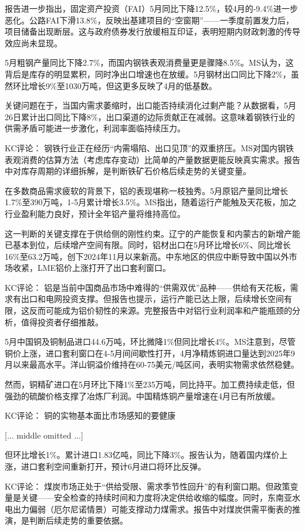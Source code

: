 \documentclass[11pt]{ctexart}
\begin{document}
报告进一步指出，固定资产投资（FAI）5月同比下降12.5\%，较4月的-9.4\%进一步恶化。公路FAI下滑13.8\%，反映出基建项目的“空窗期”——一季度前置发力后，项目储备出现断层。这与政府债券发行放缓相互印证，表明短期内财政刺激的传导效应尚未显现。

5月粗钢产量同比下降2.7\%，而国内钢铁表观消费量更是骤降8.5\%。MS认为，这背后是库存的明显累积，同时净出口增速也在放缓。5月钢材出口同比下降2\%，虽然环比增长9\%至1030万吨，但这更多反映了4月的低基数。

关键问题在于，当国内需求萎缩时，出口能否持续消化过剩产能？从数据看，5月26日累计出口同比下降8\%，出口渠道的边际贡献正在减弱。这意味着钢铁行业的供需矛盾可能进一步激化，利润率面临持续压力。

KC评论： 钢铁行业正在经历“内需塌陷、出口见顶”的双重挤压。MS对国内钢铁表观消费的估算方法（考虑库存变动）比简单的产量数据更能反映真实需求。报告中对库存周期的详细拆解，是判断铁矿石价格后续走势的关键变量。

在多数商品需求疲软的背景下，铝的表现堪称一枝独秀。5月原铝产量同比增长1.7\%至390万吨，1-5月累计增长3.5\%。MS指出，随着运行产能触及天花板，加之行业盈利能力良好，预计全年铝产量将维持高位。

这一判断的关键支撑在于供给侧的刚性约束。辽宁的产能恢复和内蒙古的新增产能已基本到位，后续增产空间有限。同时，铝材出口在5月环比增长6\%、同比增长16\%至63.2万吨，创下2024年11月以来新高。中东地区的供应中断导致中国以外市场收紧，LME铝价上涨打开了出口套利窗口。

KC评论： 铝是当前中国商品市场中难得的“供需双优”品种——供给有天花板，需求有出口和电网投资支撑。但报告也提示，运行产能已达上限，后续增长空间有限，这反而可能成为铝价韧性的来源。完整报告中对铝行业利润率和产能瓶颈的分析，值得投资者仔细推敲。

5月中国铜及铜制品进口44.6万吨，环比微降1\%但同比增长4\%。MS注意到，尽管铜价上涨，进口套利窗口在4-5月间间歇性打开，4月净精炼铜进口量达到2025年9月以来最高水平。洋山铜溢价维持在60-75美元/吨区间，表明实物需求依然稳健。

然而，铜精矿进口在5月环比下降1\%至235万吨，同比持平。加工费持续走低，但强劲的硫酸价格支撑了冶炼厂利润。中国精炼铜产量增速在4月已有所放缓。

KC评论： 铜的实物基本面比市场感知的要健康

[... middle omitted ...]

但环比增长1\%。累计进口1.83亿吨，同比下降3\%。报告认为，随着国内煤价上涨，进口套利空间重新打开，预计6月进口将环比反弹。

KC评论： 煤炭市场正处于“供给受限、需求季节性回升”的有利窗口期。但政策变量是关键——安全检查的持续时间和力度将决定供给收缩的幅度。同时，东南亚水电出力偏弱（厄尔尼诺情景）可能支撑动力煤需求。报告中对煤炭供需平衡表的推演，是判断后续走势的重要依据。
\end{document}
